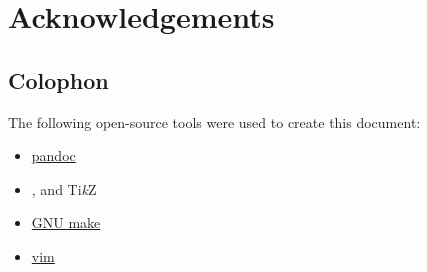 \chapter*{Acknowledgements}


\section*{Colophon}

The following open-source tools were used to create this document:

\begin{itemize}
\item \href{https://pandoc.org}{pandoc}
\item \LaTeXe{}, \XeLaTeX{} and Ti\textit{k}Z
\item \href{https://www.gnu.org/software/make}{GNU make}
\item \href{https://www.vim.org}{vim}
\end{itemize}
